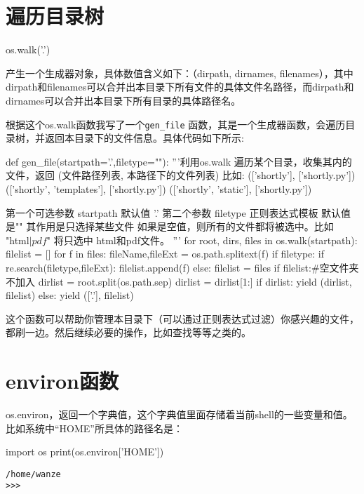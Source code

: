 \documentclass[12pt,oneside]{book}
\begin{document}
\begin{common-format}
\section{遍历目录树}
\begin{tcbpython}[]
os.walk('.')
\end{tcbpython}

产生一个生成器对象，具体数值含义如下：（dirpath, dirnames, filenames），其中dirpath和filenames可以合并出本目录下所有文件的具体文件名路径，而dirpath和dirnames可以合并出本目录下所有目录的具体路径名。

根据这个os.walk函数我写了一个\verb+gen_file+ 函数，其是一个生成器函数，会遍历目录树，并返回本目录下的文件信息。具体代码如下所示:

\begin{tcbpython}[]
def gen_file(startpath='.',filetype=""):
    '''利用os.walk 遍历某个目录，收集其内的文件，返回
    (文件路径列表, 本路径下的文件列表)
    比如:
    (['shortly'], ['shortly.py'])
(['shortly', 'templates'], ['shortly.py'])
(['shortly', 'static'], ['shortly.py'])

    第一个可选参数 startpath  默认值 '.'
    第二个参数  filetype  正则表达式模板 默认值是"" 其作用是只选择某些文件
    如果是空值，则所有的文件都将被选中。比如 "html$|pdf$" 将只选中 html和pdf文件。
    '''
    for root, dirs, files in os.walk(startpath):
        filelist = []
        for f in files:
            fileName,fileExt = os.path.splitext(f)
            if filetype:
                if re.search(filetype,fileExt):
                    filelist.append(f)
            else:
                filelist = files
        if filelist:#空文件夹不加入
            dirlist = root.split(os.path.sep)
            dirlist = dirlist[1:]
            if dirlist:
                yield (dirlist, filelist)
            else:
                yield (['.'], filelist)
\end{tcbpython}

这个函数可以帮助你管理本目录下（可以通过正则表达式过滤）你感兴趣的文件，都刷一边。然后继续必要的操作，比如查找等等之类的。

\section{environ函数}
os.environ，返回一个字典值，这个字典值里面存储着当前shell的一些变量和值。比如系统中“HOME”所具体的路径名是：
\begin{tcbpython}[]
import os
print(os.environ['HOME'])
\end{tcbpython}
\begin{Verbatim}
/home/wanze
>>> 
\end{Verbatim}


\end{common-format}
\end{document}
